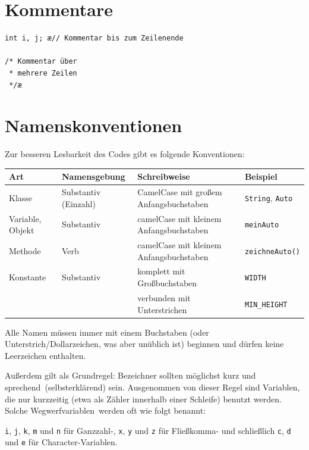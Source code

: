 \section{Kommentare}

\begin{lstlisting}
int i, j; æ// Kommentar bis zum Zeilenende

/* Kommentar über
 * mehrere Zeilen
 */æ
\end{lstlisting}


\section{Namenskonventionen}

Zur besseren Lesbarkeit des Codes gibt es folgende Konventionen:

\begin{tabular}{|l|l|l|l|}\hline
\textbf{Art} & \textbf{Namensgebung} & \textbf{Schreibweise} & \textbf{Beispiel}
\\ \hline
Klasse & Substantiv (Einzahl) & CamelCase mit großem Anfangsbuchstaben &
{\lstinline|String|}, {\lstinline|Auto|} \\ \hline
Variable, Objekt & Substantiv & camelCase mit
kleinem Anfangsbuchstaben & {\lstinline|meinAuto|} 
\\ \hline
Methode & Verb & camelCase mit kleinem
Anfangsbuchstaben & {\lstinline|zeichneAuto()|}
\\ \hline
Konstante & Substantiv & komplett mit Großbuchstaben &
{\lstinline|WIDTH|} 
\\
&& verbunden mit Unterstrichen &  {\lstinline|MIN_HEIGHT|}
\\ \hline
\end{tabular}

\medskip
Alle Namen müssen immer mit einem Buchstaben (oder Unterstrich/Dollarzeichen,
was aber unüblich ist) beginnen und dürfen keine Leerzeichen enthalten. 

Außerdem gilt als Grundregel: Bezeichner sollten möglichst kurz und \glqq
sprechend\grqq\ (selbsterklärend) sein. Ausgenommen von dieser Regel sind
Variablen, die nur kurzzeitig (etwa als Zähler innerhalb einer Schleife) benutzt
werden. Solche \glqq Wegwerfvariablen\grqq\ werden oft wie folgt benannt:

\lstinline|i|, \lstinline|j|, \lstinline|k|, \lstinline|m| und \lstinline|n|
für Ganzzahl-, \lstinline|x|, \lstinline|y| und \lstinline|z| für
Fließkomma- und schließlich \lstinline|c|, \lstinline|d| und
\lstinline|e| für Character-Variablen.

